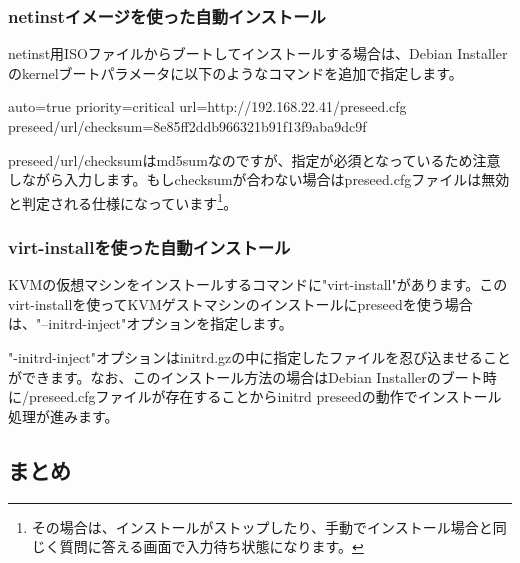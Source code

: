 \documentclass[mingoth,a4paper]{jsarticle}
\begin{document}
\subsubsection{netinstイメージを使った自動インストール}

netinst用ISOファイルからブートしてインストールする場合は、Debian Installerのkernelブートパラメータに以下のようなコマンドを追加で指定します。

\begin{commandline}
auto=true priority=critical url=http://192.168.22.41/preseed.cfg preseed/url/checksum=8e85ff2ddb966321b91f13f9aba9dc9f
\end{commandline}

preseed/url/checksumはmd5sumなのですが、指定が必須となっているため注意しながら入力します。もしchecksumが合わない場合はpreseed.cfgファイルは無効と判定される仕様になっています\footnote{その場合は、インストールがストップしたり、手動でインストール場合と同じく質問に答える画面で入力待ち状態になります。}。


\subsubsection{virt-installを使った自動インストール}

KVMの仮想マシンをインストールするコマンドに"virt-install"があります。このvirt-installを使ってKVMゲストマシンのインストールにpreseedを使う場合は、"--initrd-inject"オプションを指定します。

"-initrd-inject"オプションはinitrd.gzの中に指定したファイルを忍び込ませることができます。なお、このインストール方法の場合はDebian Installerのブート時に/preseed.cfgファイルが存在することからinitrd preseedの動作でインストール処理が進みます。



\subsection{まとめ}
\end{document}
